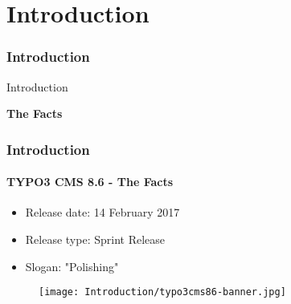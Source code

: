 %

\section{Introduction}
\begin{frame}[fragile]
	\frametitle{Introduction}

	\begin{center}\huge{Introduction}\end{center}
	\begin{center}\huge{\color{typo3darkgrey}\textbf{The Facts}}\end{center}

\end{frame}

\begin{frame}[fragile]
	\frametitle{Introduction}
	\framesubtitle{TYPO3 CMS 8.6 - The Facts}

	\begin{itemize}
		\item Release date: 14 February 2017
		\item Release type: Sprint Release
		\item Slogan: "Polishing"
	\end{itemize}

	\begin{figure}
		\texttt{[image: Introduction/typo3cms86-banner.jpg]}
	\end{figure}

\end{frame}

